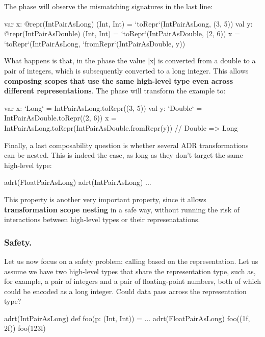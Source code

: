 The \coerce{} phase will observe the mismatching signatures in the last line:

\begin{lstlisting-nobreak}
var x: @repr(IntPairAsLong) (Int, Int) = `toRepr`(IntPairAsLong, (3, 5))
val y: @repr(IntPairAsDouble) (Int, Int) = `toRepr`(IntPairAsDouble, (2, 6))
x = `toRepr`(IntPairAsLong, `fromRepr`(IntPairAsDouble, y))
\end{lstlisting-nobreak}

What happens is that, in the \coerce{} phase the value |x| is converted from a double to a pair of integers, which is subsequently converted to a long integer. This allows \textbf{composing scopes that use the same high-level type even across different representations}. The \commit{} phase will transform the example to:

\begin{lstlisting-nobreak}
var x: `Long` = IntPairAsLong.toRepr((3, 5))
val y: `Double` = IntPairAsDouble.toRepr((2, 6))
x = IntPairAsLong.toRepr(IntPairAsDouble.fromRepr(y)) // Double => Long
\end{lstlisting-nobreak}

Finally, a last composability question is whether several ADR transformations can be nested. This is indeed the case, as long as they don't target the same high-level type:

\begin{lstlisting-nobreak}
adrt(FloatPairAsLong) {
  adrt(IntPairAsLong) {
    ...
  }
}
\end{lstlisting-nobreak}

This property is another very important property, since it allows \textbf{transformation scope nesting} in a safe way, without running the risk of interactions between high-level types or their represenatations.

\subsubsection{Safety.} Let us now focus on a safety problem: calling based on the representation. Let us assume we have two high-level types that share the representation type, such as, for example, a pair of integers and a pair of floating-point numbers, both of which could be encoded as a long integer. Could data pass across the representation type?

\begin{lstlisting-nobreak}
adrt(IntPairAsLong) { def foo(p: (Int, Int)) = ... }
adrt(FloatPairAsLong) { foo((1f, 2f)) }
foo(123l)
\end{lstlisting-nobreak}

